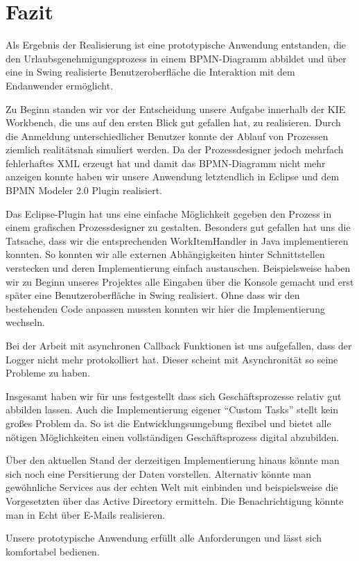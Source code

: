 \section{Fazit}
Als Ergebnis der Realisierung ist eine prototypische Anwendung entstanden, die den Urlaubsgenehmigungsprozess in einem BPMN-Diagramm abbildet und über eine in Swing realisierte Benutzeroberfläche die Interaktion mit dem Endanwender ermöglicht.

Zu Beginn standen wir vor der Entscheidung unsere Aufgabe innerhalb der KIE Workbench, die uns auf den ersten Blick gut gefallen hat, zu realisieren. Durch die Anmeldung unterschiedlicher Benutzer konnte der Ablauf von Prozessen ziemlich realitätsnah simuliert werden. Da der Prozessdesigner jedoch mehrfach fehlerhaftes XML erzeugt hat und damit das BPMN-Diagramm nicht mehr anzeigen konnte haben wir unsere Anwendung letztendlich in Eclipse und dem BPMN Modeler 2.0 Plugin realisiert.

Das Eclipse-Plugin hat uns eine einfache Möglichkeit gegeben den Prozess in einem grafischen Prozessdesigner zu gestalten. Besonders gut gefallen hat uns die Tatsache, dass wir die entsprechenden WorkItemHandler in Java implementieren konnten. So konnten wir alle externen Abhängigkeiten hinter Schnittstellen verstecken und deren Implementierung einfach austauschen. Beispielsweise haben wir zu Beginn unseres Projektes alle Eingaben über die Konsole gemacht und erst später eine Benutzeroberfläche in Swing realisiert. Ohne dass wir den bestehenden Code anpassen mussten konnten wir hier die Implementierung wechseln.

Bei der Arbeit mit asynchronen Callback Funktionen ist uns aufgefallen, dass der Logger nicht mehr protokolliert hat. Dieser scheint mit Asynchronität so seine Probleme zu haben.

Insgesamt haben wir für uns festgestellt dass sich Geschäftsprozesse relativ gut abbilden lassen. Auch die Implementierung eigener "`Custom Tasks"' stellt kein großes Problem da. So ist die Entwicklungsumgebung flexibel und bietet alle nötigen Möglichkeiten einen vollständigen Geschäftsprozess digital abzubilden.

Über den aktuellen Stand der derzeitigen Implementierung hinaus könnte man sich noch eine Persitierung der Daten vorstellen. Alternativ könnte man gewöhnliche Services aus der echten Welt mit einbinden und beispielsweise die Vorgesetzten über das Active Directory ermitteln. Die Benachrichtigung könnte man in Echt über E-Mails realisieren.

Unsere prototypische Anwendung erfüllt alle Anforderungen und lässt sich komfortabel bedienen.